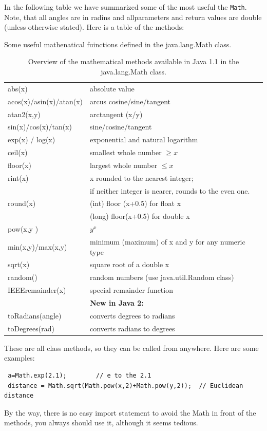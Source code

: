 In the following table we have summarized some of the most useful the 
\verb|Math|. Note, that all angles are in radins and allparameters and
return values are double (unless otherwise stated). 
Here is a table of the methods:
\begin{table}[htbp]
\caption{Some useful mathenatical fuinctions defined in the
  java.lang.Math class.}
  \begin{center}
    \leavevmode
    \begin{tabular}{ll}
      abs(x) & absolute value \\
      acos(x)/asin(x)/atan(x) & arcus cosine/sine/tangent \\
      atan2(x,y) & arctangent (x/y)  \\
      sin(x)/cos(x)/tan(x) & sine/cosine/tangent\\
      exp(x) / log(x) & exponential and natural logarithm \\
      ceil(x) & smallest whole number $\ge x$ \\
      floor(x) & largest whole number $\le x$ \\
      rint(x) & x rounded to the nearest integer; \\
             &  if neither integer is
                        nearer, rounds to the even one. \\
      round(x) & (int) floor (x+0.5) for float x \\
       ~       & (long) floor(x+0.5) for double x \\
      pow(x,y ) & $y^x$\\
      min(x,y)/max(x,y)  & minimum (maximum)  of x and y for any numeric type  \\
      sqrt(x) & square root of a double x\\
      random() & random numbers (use java.util.Random class)\\
      IEEEremainder(x) & special remainder function \\\hline
      & \textbf{New in Java 2:} \\
      toRadians(angle) & converts degrees to radians\\
      toDegrees(rad) & converts radians to degrees \
    \end{tabular}
    \caption{Overview of the mathematical methods available in Java 1.1 in the java.lang.Math class.}
    \label{tab:math_table}
  \end{center}
\end{table}

These are all class methods, so they can be called from anywhere.
Here are some examples:
\begin{verbatim}
 a=Math.exp(2.1);        // e to the 2.1
 distance = Math.sqrt(Math.pow(x,2)+Math.pow(y,2));  // Euclidean distance
\end{verbatim} 
By the way, there is no easy import statement to avoid the Math in front
of the methods, you always should use it, although it seems 
tedious.

